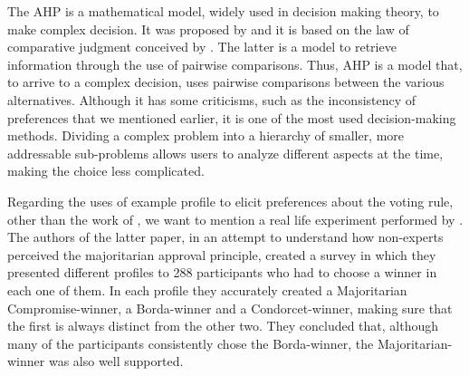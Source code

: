 The \ac{AHP} is a mathematical model, widely used in decision making theory, to make complex decision. It was proposed by \citet{Saaty1986} and it is based on the law of comparative judgment conceived by \citet{Thurstone1927}. The latter is a model to retrieve information through the use of pairwise comparisons. Thus, \ac{AHP} is a model that, to arrive to a complex decision, uses pairwise comparisons between the various alternatives.
Although it has some criticisms, such as the inconsistency of preferences that we mentioned earlier, it is one of the most used decision-making methods. Dividing a complex problem into a hierarchy of smaller, more addressable sub-problems allows users to analyze different aspects at the time, making the choice less complicated.

Regarding the uses of example profile to elicit preferences about the voting rule, other than the work of \citet{Cailloux2014}, we want to mention a real life experiment performed by \citet{Giritligil2005}. The authors of the latter paper, in an attempt to understand how non-experts perceived the majoritarian approval principle, created a survey in which they presented different profiles to 288 participants who had to choose a winner in each one of them. In each profile they accurately created a Majoritarian Compromise-winner, a Borda-winner and a Condorcet-winner, making sure that the first is always distinct from the other two. They concluded that, although many of the participants consistently chose the Borda-winner, the Majoritarian-winner was also well supported.

